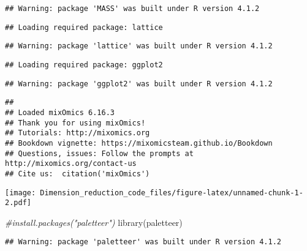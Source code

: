 \documentclass[
]{article}
\newenvironment{Shaded}{\begin{snugshade}}{\end{snugshade}}
\newcommand{\CommentTok}[1]{\textcolor[rgb]{0.56,0.35,0.01}{\textit{#1}}}
\newcommand{\FunctionTok}[1]{\textcolor[rgb]{0.00,0.00,0.00}{#1}}
\newcommand{\NormalTok}[1]{#1}
\begin{document}
\begin{verbatim}
## Warning: package 'MASS' was built under R version 4.1.2
\end{verbatim}

\begin{verbatim}
## Loading required package: lattice
\end{verbatim}

\begin{verbatim}
## Warning: package 'lattice' was built under R version 4.1.2
\end{verbatim}

\begin{verbatim}
## Loading required package: ggplot2
\end{verbatim}

\begin{verbatim}
## Warning: package 'ggplot2' was built under R version 4.1.2
\end{verbatim}

\begin{verbatim}
## 
## Loaded mixOmics 6.16.3
## Thank you for using mixOmics!
## Tutorials: http://mixomics.org
## Bookdown vignette: https://mixomicsteam.github.io/Bookdown
## Questions, issues: Follow the prompts at http://mixomics.org/contact-us
## Cite us:  citation('mixOmics')
\end{verbatim}

\texttt{[image: Dimension\_reduction\_code\_files/figure-latex/unnamed-chunk-1-2.pdf]}

\begin{Shaded}
\begin{Highlighting}[]
\CommentTok{\#install.packages("paletteer")}
\FunctionTok{library}\NormalTok{(paletteer)}
\end{Highlighting}
\end{Shaded}

\begin{verbatim}
## Warning: package 'paletteer' was built under R version 4.1.2
\end{verbatim}
\end{document}
